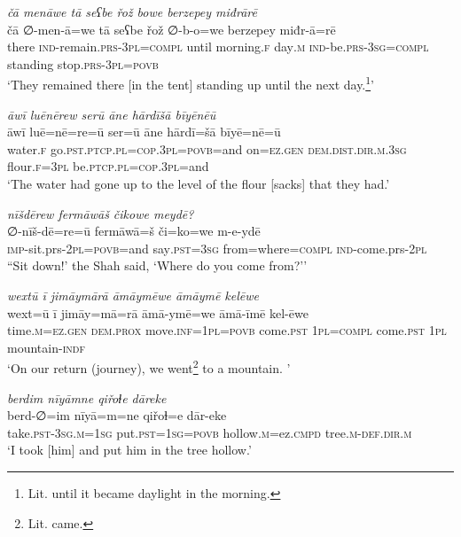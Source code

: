 \ea \label{ZB.26}
\textit{čā menāwe tā seʕbe řož bowe berzepey miđrārē} \\ 
\gll čā ∅-men-ā=we tā seʕbe řož ∅-b-o=we berzepey miđr-ā=rē \\ 
 there \textsc{ind-}remain\textsc{.prs}\textsc{-3pl}\textsc{=compl} until morning\textsc{.f} day\textsc{.m} \textsc{ind-}be\textsc{.prs}\textsc{-3sg}\textsc{=\textsc{compl}} standing stop\textsc{.prs}\textsc{-3pl}\textsc{=\textsc{povb}} \\ 
\glt `They remained there [in the tent] standing up until the next day.\footnote{Lit. until it became daylight in the morning.}'
\z 
 
\ea \label{ZB.28}
\textit{āwī luēnērew serū āne hārdīšā bīyēnēū} \\ 
\gll āwī luē=nē=re=ū ser=ū āne hārdī=šā bīyē=nē=ū \\ 
 water\textsc{.f} go\textsc{.pst}\textsc{.ptcp}\textsc{.pl}\textsc{=cop}\textsc{.3pl}\textsc{=\textsc{povb}}=and on\textsc{\textsc{=ez.gen}} \textsc{dem.dist}\textsc{.dir}\textsc{.m}\textsc{.3sg} flour\textsc{.f}\textsc{=3pl} be\textsc{.ptcp}\textsc{.pl}\textsc{=cop}\textsc{.3pl}=and \\ 
\glt `The water had gone up to the level of the flour [sacks] that they had.'
\z 
 
\ea \label{ZQ.4}
\textit{nīšdērew fermāwāš čikowe meydē?} \\ 
\gll ∅-nīš-dē=re=ū fermāwā=š či=ko=we m-e-ydē \\ 
 \textsc{imp-}sit.prs-\textsc{2pl}\textsc{=\textsc{povb}}=and say\textsc{.pst}\textsc{=3sg} from=where\textsc{=compl} \textsc{ind-}come.prs-\textsc{2pl} \\ 
\glt ``Sit down!' the Shah said, ‘Where do you come from?’'
\z 
 
\ea \label{ZQ.11}
\textit{wextū ī jimāymārā āmāymēwe āmāymē kelēwe} \\ 
\gll wext=ū ī jimāy=mā=rā āmā-ymē=we āmā-īmē kel-ēwe \\ 
 time\textsc{.m}\textsc{=ez.gen} \textsc{dem.prox} move\textsc{.inf}\textsc{=\textsc{1pl}}\textsc{=\textsc{povb}} come\textsc{.pst} \textsc{1pl}\textsc{=compl} come\textsc{.pst} \textsc{1pl} mountain\textsc{-indf} \\ 
\glt `On our return (journey), we went\footnote{Lit. came.}  to a mountain. '
\z 
 
\ea \label{ZQ.24}
\textit{berdim nīyāmne qiřoɫe dāreke} \\ 
\gll berd-∅=im nīyā=m=ne qiřoɫ=e dār-eke \\ 
 take\textsc{.pst}\textsc{-3sg}\textsc{.m}\textsc{=\textsc{1sg}} put\textsc{.pst}\textsc{=\textsc{1sg}}\textsc{=\textsc{povb}} hollow\textsc{.m}=ez\textsc{.cmpd} tree\textsc{.m}\textsc{-def}\textsc{.dir}\textsc{.m} \\ 
\glt `I took [him] and put him in the tree hollow.'
\z 
 
